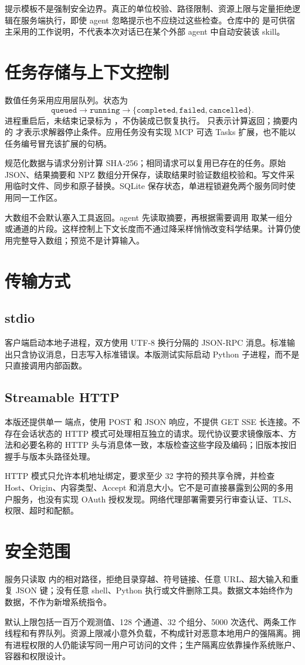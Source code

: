 提示模板不是强制安全边界。真正的单位校验、路径限制、资源上限与定量拒绝逻辑在服务端执行，即使 agent 忽略提示也不应绕过这些检查。仓库中的  是可供宿主采用的工作说明，不代表本次对话已在某个外部 agent 中自动安装该 skill。

\section{任务存储与上下文控制}
数值任务采用应用层队列。状态为
\begin{equation*}
\texttt{queued}\to\texttt{running}\to
\{\texttt{completed},\texttt{failed},\texttt{cancelled}\}.
\end{equation*}
进程重启后，未结束记录标为 ，不伪装成已恢复执行。 只表示计算返回；摘要内的  才表示求解器停止条件。应用任务没有实现 MCP 可选 Tasks 扩展，也不能以任务编号冒充该扩展的句柄。

规范化数据与请求分别计算 SHA-256；相同请求可以复用已存在的任务。原始 JSON、结果摘要和 NPZ 数组分开保存，读取结果时验证数组校验和。写文件采用临时文件、同步和原子替换。SQLite 保存状态，单进程锁避免两个服务同时使用同一工作区。

大数组不会默认塞入工具返回。agent 先读取摘要，再根据需要调用  取某一组分或通道的片段。这样控制上下文长度而不通过降采样悄悄改变科学结果。计算仍使用完整导入数组；预览不是计算输入。

\section{传输方式}
\subsection{stdio}
客户端启动本地子进程，双方使用 UTF-8 换行分隔的 JSON-RPC 消息。标准输出只含协议消息，日志写入标准错误\cite{mcpstdio}。本版测试实际启动 Python 子进程，而不是只直接调用内部函数。

\subsection{Streamable HTTP}
本版还提供单一  端点，使用 POST 和 JSON 响应，不提供 GET SSE 长连接。不存在会话状态的 HTTP 模式可处理相互独立的请求。现代协议要求镜像版本、方法和必要名称的 HTTP 头与消息体一致，本版检查这些字段及编码\cite{mcphttp}；旧版本按旧握手与版本头路径处理\cite{mcplegacy}。

HTTP 模式只允许本机地址绑定，要求至少 32 字符的预共享令牌，并检查 Host、Origin、内容类型、Accept 和消息大小。它不是可直接暴露到公网的多用户服务，也没有实现 OAuth 授权发现。网络代理部署需要另行审查认证、TLS、权限、超时和配额。

\section{安全范围}
服务只读取  内的相对路径，拒绝目录穿越、符号链接、任意 URL、超大输入和重复 JSON 键；没有任意 shell、Python 执行或文件删除工具。数据文本始终作为数据，不作为新增系统指令。

默认上限包括一百万个观测值、128 个通道、32 个组分、5000 次迭代、两条工作线程和有界队列。资源上限减小意外负载，不构成针对恶意本地用户的强隔离。拥有进程权限的人仍能读写同一用户可访问的文件；生产隔离应依靠操作系统账户、容器和权限设计。
